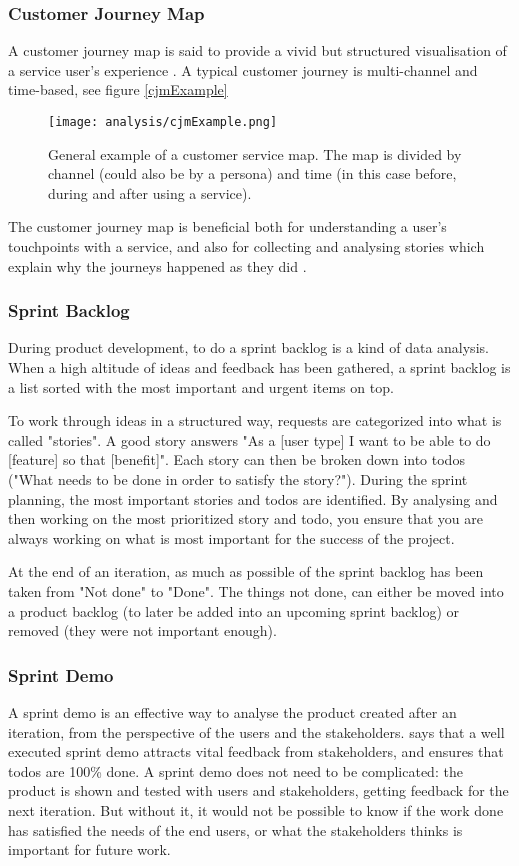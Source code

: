 \subsubsection{Customer Journey Map}
A customer journey map is said to provide a vivid but structured visualisation of a service user's experience \citep{stickdorn}. A typical customer journey is multi-channel and time-based, see figure \ref{cjmExample}

\begin{figure}[h]
    \centering
    \texttt{[image: analysis/cjmExample.png]}
    \caption{General example of a customer service map. The map is divided by channel (could also be by a persona) and time (in this case before, during and after using a service).}
    \label{fig:cjmExample}
\end{figure}

The customer journey map is beneficial both for understanding a user's touchpoints with a service, and also for collecting and analysing stories which explain why the journeys happened as they did \citep{stickdorn}.

\subsubsection{Sprint Backlog}
During product development, to do a sprint backlog is a kind of data analysis. When a high altitude of ideas and feedback has been gathered, a sprint backlog is a list sorted with the most important and urgent items on top.

To work through ideas in a structured way, requests are categorized into what is called "stories". A good story answers "As a [user type] I want to be able to do [feature] so that [benefit]". Each story can then be broken down into todos ("What needs to be done in order to satisfy the story?"). During the sprint planning, the most important stories and todos are identified. By analysing and then working on the most prioritized story and todo, you ensure that you are always working on what is most important for the success of the project.

At the end of an iteration, as much as possible of the sprint backlog has been taken from "Not done" to "Done". The things not done, can either be moved into a product backlog (to later be added into an upcoming sprint backlog) or removed (they were not important enough).

\subsubsection{Sprint Demo}
A sprint demo is an effective way to analyse the product created after an iteration, from the perspective of the users and the stakeholders. \cite{kniberg} says that a well executed sprint demo attracts vital feedback from stakeholders, and ensures that todos are 100\% done. A sprint demo does not need to be complicated: the product is shown and tested with users and stakeholders, getting feedback for the next iteration. But without it, it would not be possible to know if the work done has satisfied the needs of the end users, or what the stakeholders thinks is important for future work.

